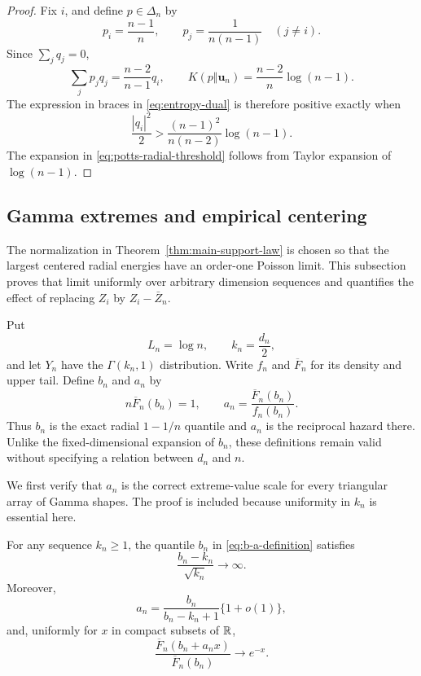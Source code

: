 \begin{proof}
Fix \(i\), and define \(p\in\Delta_n\) by
\[
 p_i=\frac{n-1}{n},
 \qquad
 p_j=\frac1{n(n-1)}\quad(j\ne i).
\]
Since \(\sum_jq_j=0\),
\[
 \sum_jp_jq_j=\frac{n-2}{n-1}q_i,
 \qquad
 K(p\Vert \mathbf u_n)=\frac{n-2}{n}\log(n-1).
\]
The expression in braces in \eqref{eq:entropy-dual} is therefore positive
exactly when
\[
 \frac{|q_i|^2}{2}>
 \frac{(n-1)^2}{n(n-2)}\log(n-1).
\]
The expansion in \eqref{eq:potts-radial-threshold} follows from Taylor
expansion of \(\log(n-1)\).
\end{proof}

\subsection{Gamma extremes and empirical centering}\label{sec:mv-gamma-normalization}

The normalization in Theorem~\ref{thm:main-support-law} is chosen so that the
largest centered radial energies have an order-one Poisson limit. This
subsection proves that limit uniformly over arbitrary dimension sequences and
quantifies the effect of replacing \(Z_i\) by \(Z_i-\bar Z_n\).

Put
\[
  L_n=\log n,
  \qquad
  k_n=\frac{d_n}{2},
\]
and let \(Y_n\) have the \(\Gamma(k_n,1)\) distribution. Write \(f_n\) and
\(\overline F_n\) for its density and upper tail. Define \(b_n\) and \(a_n\)
by
\begin{equation}
\label{eq:b-a-definition}
  n\overline F_n(b_n)=1,
  \qquad
  a_n=\frac{\overline F_n(b_n)}{f_n(b_n)}.
\end{equation}
Thus \(b_n\) is the exact radial \(1-1/n\) quantile and \(a_n\) is the
reciprocal hazard there. Unlike the fixed-dimensional expansion of \(b_n\),
these definitions remain valid without specifying a relation between \(d_n\)
and \(n\).

We first verify that \(a_n\) is the correct extreme-value scale for every
triangular array of Gamma shapes. The proof is included because uniformity in
\(k_n\) is essential here.

\begin{lemma}
\label{lem:gamma-hazard}
For any sequence \(k_n\ge1\), the quantile \(b_n\) in
\eqref{eq:b-a-definition} satisfies
\[
  \frac{b_n-k_n}{\sqrt{k_n}}\longrightarrow\infty.
\]
Moreover,
\begin{equation}
\label{eq:hazard-asymptotic}
  a_n
  =
  \frac{b_n}{b_n-k_n+1}\{1+o(1)\},
\end{equation}
and, uniformly for \(x\) in compact subsets of \(\mathbb R\),
\begin{equation}
\label{eq:gamma-tail-ratio}
  \frac{\overline F_n(b_n+a_nx)}{\overline F_n(b_n)}
  \longrightarrow e^{-x}.
\end{equation}
\end{lemma}

